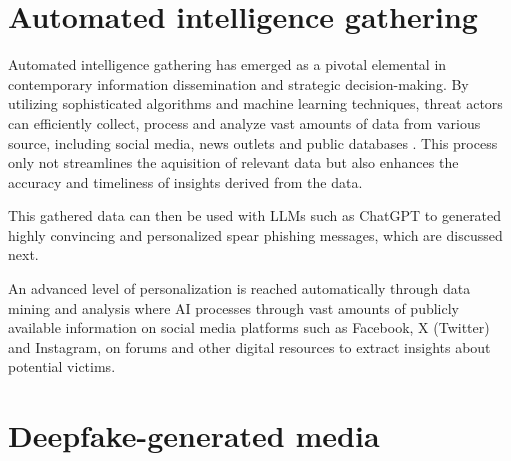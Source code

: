 
\section{Automated intelligence gathering}

\begin{comment}

Automated intelligence gathering

What to cover:
    - What is automated intelligence gathering
    - Työkalut kuten Maltego (etsi muitakin työkaluja jos teet listan näistä, varmista netistä et ne on top 3 työkalut)
    - iCloner siitä yhdestä artikkelista All Your Contacts Are Blong To Us?

\end{comment}

Automated intelligence gathering has emerged as a pivotal elemental in contemporary information dissemination and strategic decision-making. By utilizing sophisticated algorithms and machine learning techniques, threat actors can efficiently collect, process and analyze vast amounts of data from various source, including social media, news outlets and public databases \citep{bilgeAllYourContactsAreBelongToUs2009}. This process only not streamlines the aquisition of relevant data but also enhances the accuracy and timeliness of insights derived from the data.

This gathered data can then be used with LLMs such as ChatGPT to generated highly convincing and personalized spear phishing messages, which are discussed next.

An advanced level of personalization is reached automatically through data mining and analysis where AI processes through vast amounts of publicly available information on social media platforms such as Facebook, X (Twitter) and Instagram, on forums and other digital resources to extract insights about potential victims. 















\section{Deepfake-generated media}
\begin{comment}
Deepfake-generated content

What to cover:
    - What is a deepfake
    - Deepfakeja ei käsitely aiemmin? Generative AI kappaleessa?
    - Seuraava section kertoo tietojenkalastelusta ja sitoo chatbotit, automated intelligence gathering ja nää deepfaket yhteen kokonaisuudeksi

\end{comment}

